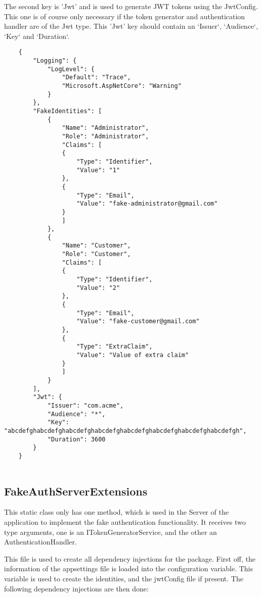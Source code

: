The second key is 'Jwt' and is used to generate JWT tokens using the JwtConfig. This one is of course only necessary if the token generator and authentication handler are of the Jwt type. This 'Jwt' key should contain an `Issuer`, `Audience`, `Key` and `Duration`.

\begin{verbatim}
    {
        "Logging": {
            "LogLevel": {
                "Default": "Trace",
                "Microsoft.AspNetCore": "Warning"
            }
        },
        "FakeIdentities": [
            {
                "Name": "Administrator",
                "Role": "Administrator",
                "Claims": [
                {
                    "Type": "Identifier",
                    "Value": "1"
                },
                {
                    "Type": "Email",
                    "Value": "fake-administrator@gmail.com"
                }
                ]
            },
            {
                "Name": "Customer",
                "Role": "Customer",
                "Claims": [
                {
                    "Type": "Identifier",
                    "Value": "2"
                },
                {
                    "Type": "Email",
                    "Value": "fake-customer@gmail.com"
                },
                {
                    "Type": "ExtraClaim",
                    "Value": "Value of extra claim"
                }
                ]
            }
        ],
        "Jwt": {
            "Issuer": "com.acme",
            "Audience": "*",
            "Key": "abcdefghabcdefghabcdefghabcdefghabcdefghabcdefghabcdefghabcdefgh",
            "Duration": 3600
        }
    }
    
\end{verbatim}

\subsection{FakeAuthServerExtensions}

This static class only has one method, which is used in the Server of the application to implement the fake authentication functionality. It receives two type arguments, one is an ITokenGeneratorService, and the other an AuthenticationHandler.

This file is used to create all dependency injections for the package. First off, the information of the appsettings file is loaded into the configuration variable. This variable is used to create the identities, and the jwtConfig file if present. The following dependency injections are then done:


